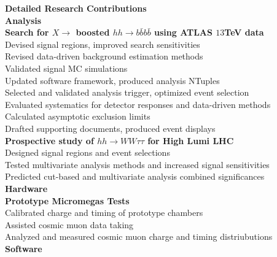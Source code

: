 \documentclass[letterpaper,11pt,oneside]{article}
\begin{document}
\newpage
\raggedright
\normalsize
\textbf{\Large{Detailed Research Contributions}} \\
\vspace{0.4cm}
 \textbf{Analysis}\\
	\vspace{0.1cm}
 	\quad \textbf{Search for $X \to$ boosted $ hh \to b\bar{b}b\bar{b}$ using ATLAS $13$TeV data}\\
	\quad \quad Devised signal regions, improved search sensitivities \\
	\quad \quad Revised data-driven background estimation methods \\
	\quad \quad Validated signal MC simulations \\
	\quad \quad Updated software framework, produced analysis NTuples \\
	\quad \quad Selected and validated analysis trigger, optimized event selection \\
	\quad \quad Evaluated systematics for detector responses and data-driven methods \\
	\quad \quad Calculated asymptotic exclusion limits \\
	\quad \quad Drafted supporting documents, produced event displays \\
	\vspace{0.1cm}
 	\quad \textbf{Prospective study of $hh \to WW\tau\tau$ for High Lumi LHC}\\
	\quad \quad  Designed signal regions and event selections\\
	\quad \quad  Tested multivariate analysis methods and increased signal sensitivities \\
	\quad \quad  Predicted cut-based and multivariate analysis combined significances \\
	\vspace{0.4cm}
 \textbf{Hardware}\\
	\vspace{0.1cm}
 	\quad \textbf{Prototype Micromegas Tests}\\
	\quad \quad Calibrated charge and timing of prototype chambers \\
	\quad \quad Assisted cosmic muon data taking \\
	\quad \quad Analyzed and measured cosmic muon charge and timing distriubutions \\
	\vspace{0.4cm}
 \textbf{Software}\\
	\vspace{0.1cm}
\end{document}
